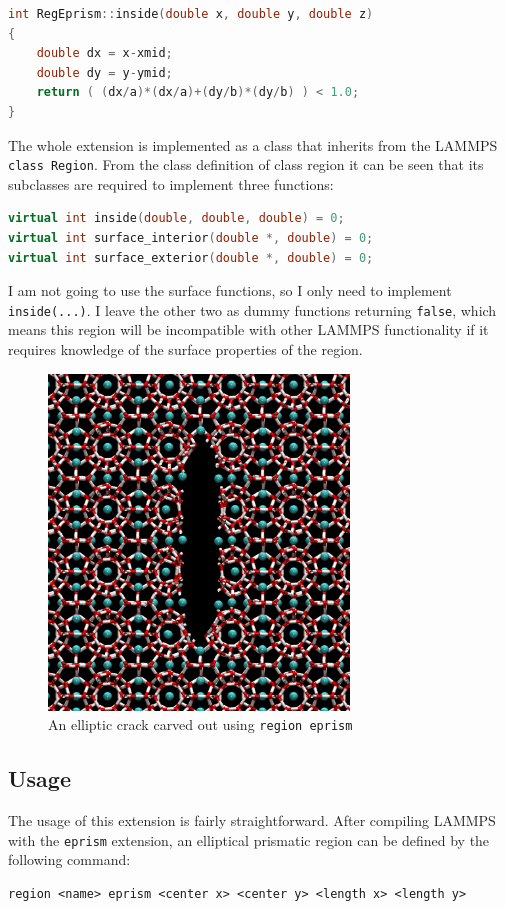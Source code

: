 \begin{lstlisting}[language=c++]
int RegEprism::inside(double x, double y, double z) 
{
	double dx = x-xmid;
	double dy = y-ymid;
	return ( (dx/a)*(dx/a)+(dy/b)*(dy/b) ) < 1.0;
}
\end{lstlisting}
The whole extension is implemented as a class that inherits from the LAMMPS {\tt class Region}. From the class definition of class region it can be seen that its subclasses are required to implement three functions:

\begin{lstlisting}[language=c++]
virtual int inside(double, double, double) = 0;
virtual int surface_interior(double *, double) = 0;
virtual int surface_exterior(double *, double) = 0;
\end{lstlisting}
I am not going to use the surface functions, so I only need to implement {\tt inside(...)}. I leave the other two as dummy functions returning {\tt false}, which means this region will be incompatible with other LAMMPS functionality if it requires knowledge of the surface properties of the region.

\begin{figure}
\centering
\includegraphics[width=8cm]{../snapshots/carved_crack.pdf}
\caption{An elliptic crack carved out using {\tt region eprism}}
\end{figure}


\subsection{Usage}
The usage of this extension is fairly straightforward. After compiling LAMMPS with the {\tt eprism} extension, an elliptical prismatic region can be defined by the following command:
\begin{lstlisting}[language=LammpsInput]
region <name> eprism <center x> <center y> <length x> <length y>
\end{lstlisting}

